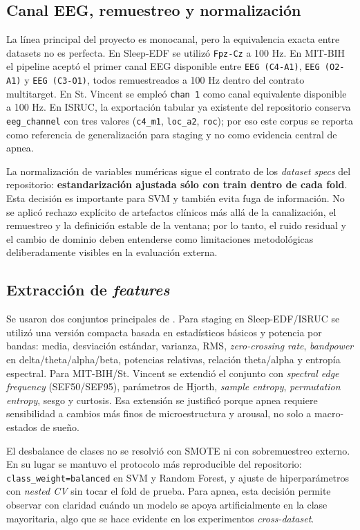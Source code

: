 \subsection{Canal EEG, remuestreo y normalizaci\'on}

La l\'inea principal del proyecto es monocanal, pero la equivalencia exacta entre datasets no es perfecta. En Sleep-EDF se utiliz\'o \texttt{Fpz-Cz} a 100 Hz. En MIT-BIH el pipeline acept\'o el primer canal EEG disponible entre \texttt{EEG (C4-A1)}, \texttt{EEG (O2-A1)} y \texttt{EEG (C3-O1)}, todos remuestreados a 100 Hz dentro del contrato multitarget. En St. Vincent se emple\'o \texttt{chan 1} como canal equivalente disponible a 100 Hz. En ISRUC, la exportaci\'on tabular ya existente del repositorio conserva \texttt{eeg\_channel} con tres valores (\texttt{c4\_m1}, \texttt{loc\_a2}, \texttt{roc}); por eso este corpus se reporta como referencia de generalizaci\'on para staging y no como evidencia central de apnea.

La normalizaci\'on de variables num\'ericas sigue el contrato de los \emph{dataset specs} del repositorio: \textbf{estandarizaci\'on ajustada s\'olo con train dentro de cada fold}. Esta decisi\'on es importante para SVM y tambi\'en evita fuga de informaci\'on. No se aplic\'o rechazo expl\'icito de artefactos cl\'inicos m\'as all\'a de la canalizaci\'on, el remuestreo y la definici\'on estable de la ventana; por lo tanto, el ruido residual y el cambio de dominio deben entenderse como limitaciones metodol\'ogicas deliberadamente visibles en la evaluaci\'on externa.

\subsection{Extracci\'on de \emph{features}}

Se usaron dos conjuntos principales de . Para staging en Sleep-EDF/ISRUC se utiliz\'o una versi\'on compacta basada en estad\'isticos b\'asicos y potencia por bandas: media, desviaci\'on est\'andar, varianza, RMS, \emph{zero-crossing rate}, \emph{bandpower} en delta/theta/alpha/beta, potencias relativas, relaci\'on theta/alpha y entrop\'ia espectral. Para MIT-BIH/St. Vincent se extendi\'o el conjunto con \emph{spectral edge frequency} (SEF50/SEF95), par\'ametros de Hjorth, \emph{sample entropy}, \emph{permutation entropy}, sesgo y curtosis. Esa extensi\'on se justific\'o porque apnea requiere sensibilidad a cambios m\'as finos de microestructura y arousal, no solo a macro-estados de sue\~no.

El desbalance de clases no se resolvi\'o con SMOTE ni con sobremuestreo externo. En su lugar se mantuvo el protocolo m\'as reproducible del repositorio: \texttt{class\_weight=balanced} en SVM y Random Forest, y ajuste de hiperpar\'ametros con \emph{nested CV} sin tocar el fold de prueba. Para apnea, esta decisi\'on permite observar con claridad cu\'ando un modelo se apoya artificialmente en la clase mayoritaria, algo que se hace evidente en los experimentos \emph{cross-dataset}.
